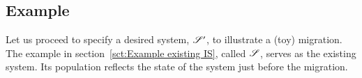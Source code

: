 \documentclass{elsarticle}
\begin{document}

\subsection{Example}
   Let us proceed to specify a desired system, $\mathscr{S}'$, to illustrate a (toy) migration.
   The example in section~\ref{sct:Example existing IS}, called $\mathscr{S}$, serves as the existing system.
   Its population reflects the state of the system just before the migration.
\end{document}
